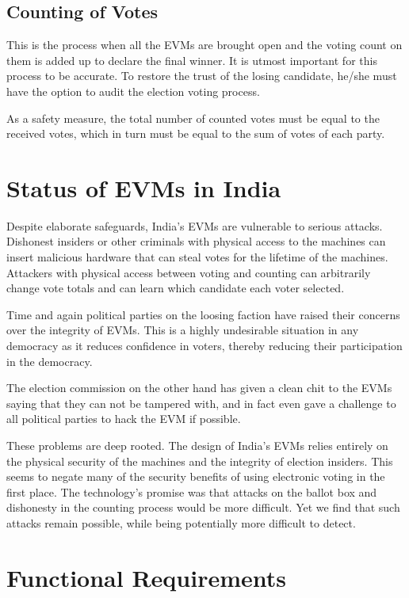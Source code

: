 \documentclass[a4paper,12pt]{extarticle}
\begin{document}
\subsection{Counting of Votes}
This is the process when all the EVMs are brought open and the voting count on them is added up to declare the final winner. It is utmost important for this process to be accurate. To restore the trust of the losing candidate, he/she must have the option to audit the election voting process.

As a safety measure, the total number of counted votes must be equal to the received votes, which in turn must be equal to the sum of votes of each party.



\section{Status of EVMs in India}

Despite elaborate safeguards, India's EVMs are vulnerable to serious attacks. Dishonest insiders or other criminals with physical access to the machines can insert malicious hardware that can steal votes for the lifetime of the machines. Attackers with physical access between voting and counting can arbitrarily change vote totals and can learn which candidate each voter selected.

Time and again political parties on the loosing faction have raised their concerns over the integrity of EVMs. This is a highly undesirable situation in any democracy as it reduces confidence in voters, thereby reducing their participation in the democracy.

The election commission on the other hand has given a clean chit to the EVMs saying that they can not be tampered with, and in fact even gave a challenge to all political parties to hack the EVM if possible.

These problems are deep rooted. The design of India's EVMs relies entirely on the physical security of the machines and the integrity of election insiders. This seems to negate many of the security benefits of using electronic voting in the first place. The technology's promise was that attacks on the ballot box and dishonesty in the counting process would be more difficult. Yet we find that such attacks remain possible, while being potentially more difficult to detect.


\section{Functional Requirements}
\end{document}
